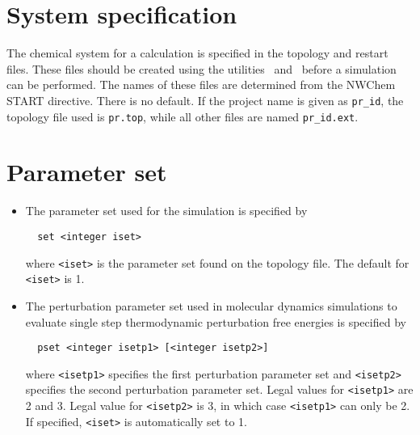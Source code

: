 \section{System specification}
The chemical system for a calculation is specified in the topology
and restart files. These files should be created using the utilities
\nwtop\ and \nwrst\ before a simulation can be performed.
The names of these files are determined from the NWChem START directive.
There is no default. If the project name is given as {\tt pr\_id},
the topology file used is {\tt pr.top}, while all other files
are named {\tt pr\_id.ext}.

\section{Parameter set}
\begin{itemize}
\item
The parameter set used for the simulation is specified by
\begin{verbatim}
  set <integer iset>
\end{verbatim}
where \verb+<iset>+ is the parameter set found on the
topology file. The default for \verb+<iset>+ is 1.
\item
The perturbation parameter set used in molecular dynamics simulations
to evaluate single step thermodynamic perturbation free energies is 
specified by
\begin{verbatim}
  pset <integer isetp1> [<integer isetp2>]
\end{verbatim}
where \verb+<isetp1>+ specifies the first perturbation parameter set and
\verb+<isetp2>+ specifies the second perturbation parameter set. Legal
values for \verb+<isetp1>+ are 2 and 3. Legal value for \verb+<isetp2>+ is
3, in which case \verb+<isetp1>+ can only be 2. If specified, \verb+<iset>+
is automatically set to 1.
\end{itemize}

